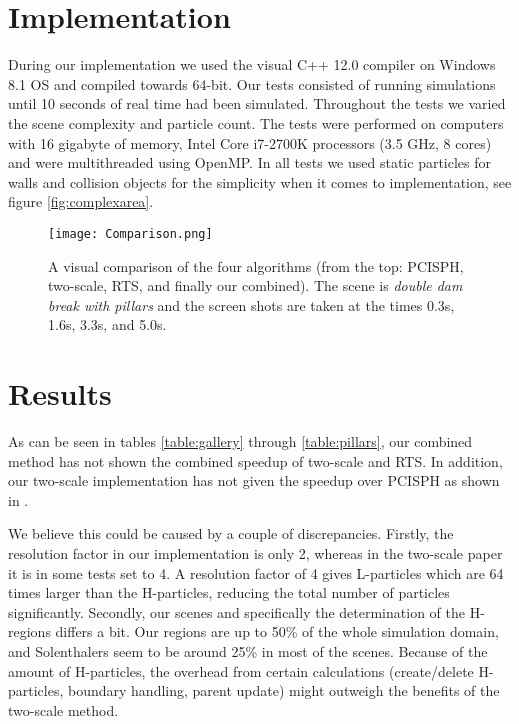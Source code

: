 \documentclass[../../main.tex]{subfiles}
\begin{document}


\section{Implementation}

During our implementation we used the visual C++ 12.0 compiler on Windows 8.1 OS and compiled towards 64-bit. Our tests consisted of running simulations until 10 seconds of real time had been simulated. Throughout the tests we varied the scene complexity and particle count. The tests were performed on computers with 16 gigabyte of memory, Intel Core i7-2700K processors (3.5 GHz, 8 cores) and were multithreaded using OpenMP. 
In all tests we used static particles for walls and collision objects for the simplicity when it comes to implementation, see figure \ref{fig:complexarea}. 

\begin{figure}[h!]
    \centering
    \texttt{[image: Comparison.png]}
    \caption[Visual comparison of the algorithms]{A visual comparison of the four algorithms (from the top: PCISPH, two-scale, RTS, and finally our combined). The scene is \textit{double dam break with pillars} and the screen shots are taken at the times 0.3s, 1.6s, 3.3s, and 5.0s. }
    \label{fig:comparison}
\end{figure}

\section{Results}

As can be seen in tables \ref{table:gallery} through \ref{table:pillars}, our combined method has not shown the combined speedup of two-scale and RTS. In addition, our two-scale implementation has not given the speedup over PCISPH as shown in \citep{solenthaler2011two}. 


We believe this could be caused by a couple of discrepancies. Firstly, the resolution factor in our implementation is only 2, whereas in the two-scale paper it is in some tests set to 4. A resolution factor of 4 gives L-particles which are 64 times larger than the H-particles, reducing the total number of particles significantly. Secondly, our scenes and specifically the determination of the H-regions differs a bit. 
Our regions are up to 50\% of the whole simulation domain, and Solenthalers seem to be around 25\% in most of the scenes. Because of the amount of H-particles, the overhead from certain calculations (create/delete H-particles, boundary handling, parent update) might outweigh the benefits of the two-scale method. 
\end{document}
